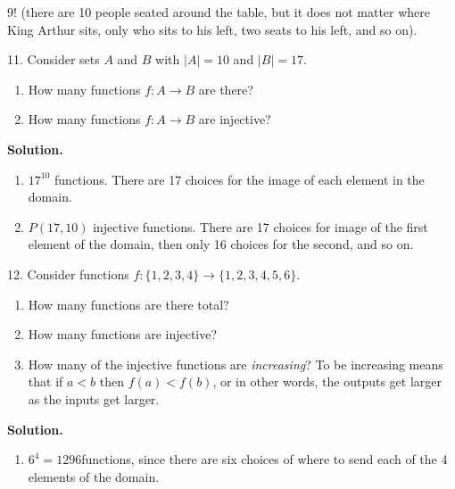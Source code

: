 \documentclass[10pt,]{book}
\theoremstyle{plain}
\theoremstyle{definition}
\theoremstyle{definition}
\theoremstyle{definition}
\numberwithin{equation}{section}
\newcommand{\lt}{ < }
\begin{document}
\begin{exerciselist}
                \(9!\) (there are 10 people seated around the table, but it does not matter where King Arthur sits, only who sits to his left, two seats to his left, and so on).
\item[11.]\hypertarget{exercise-70}{}
                Consider sets \(A\) and \(B\) with \(|A| = 10\) and \(|B| = 17\).
\leavevmode%
\begin{enumerate}[label=(\alph*)]
\item\hypertarget{li-494}{}
    How many functions \(f: A \to B\) are there?
\item\hypertarget{li-495}{}
    How many functions \(f: A \to B\) are injective?
\end{enumerate}
\par\smallskip
\par\smallskip
\noindent\textbf{Solution.}\hypertarget{solution-101}{}\quad
\leavevmode%
\begin{enumerate}[label=(\alph*)]
\item\hypertarget{li-496}{}\(17^{10}\) functions.  There are 17 choices for the image of each element in the domain.%
\item\hypertarget{li-497}{}\(P(17, 10)\) injective functions.  There are 17 choices for image of the first element of the domain, then only 16 choices for the second, and so on.%
\end{enumerate}
\item[12.]\hypertarget{exercise-71}{}
                Consider functions \(f: \{1,2,3,4\} \to \{1,2,3,4,5,6\}\).
\leavevmode%
\begin{enumerate}[label=(\alph*)]
\item\hypertarget{li-498}{}
    How many functions are there total?
\item\hypertarget{li-499}{}
    How many functions are injective?
\item\hypertarget{li-500}{} How many of the injective functions are \emph{increasing}?  To be increasing means that if \(a \lt b\) then \(f(a) \lt f(b)\), or in other words, the outputs get larger as the inputs get larger.
\end{enumerate}
\par\smallskip
\par\smallskip
\noindent\textbf{Solution.}\hypertarget{solution-102}{}\quad
\leavevmode%
\begin{enumerate}[label=(\alph*)]
\item\hypertarget{li-501}{}\(6^4 = 1296\)functions, since there are six choices of where to send each of the 4 elements of the domain.%

\end{enumerate}
\end{exerciselist}
\end{document}
